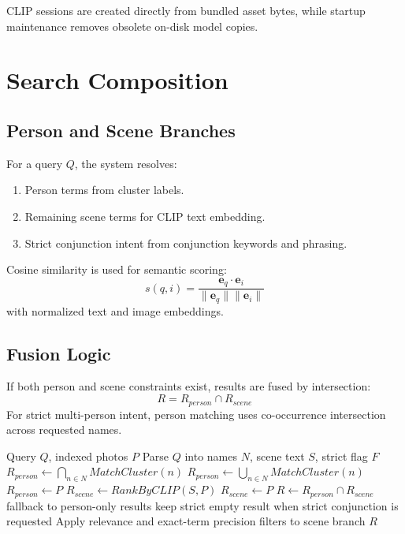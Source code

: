 \documentclass[conference]{IEEEtran}
\begin{document}
CLIP sessions are created directly from bundled asset bytes, while startup maintenance removes obsolete on-disk model copies.

\section{Search Composition}
\subsection{Person and Scene Branches}
For a query $Q$, the system resolves:
\begin{enumerate}
\item Person terms from cluster labels.
\item Remaining scene terms for CLIP text embedding.
\item Strict conjunction intent from conjunction keywords and phrasing.
\end{enumerate}

Cosine similarity is used for semantic scoring:
\begin{equation}
s(q, i) = \frac{\mathbf{e}_q \cdot \mathbf{e}_i}{\|\mathbf{e}_q\|\|\mathbf{e}_i\|}
\end{equation}
with normalized text and image embeddings.

\subsection{Fusion Logic}
If both person and scene constraints exist, results are fused by intersection:
\begin{equation}
R = R_{person} \cap R_{scene}
\end{equation}
For strict multi-person intent, person matching uses co-occurrence intersection across requested names.

\begin{algorithm}[t]
\caption{Mixed Search Fusion in Sense Gallery}
\label{alg:fusion}
\begin{algorithmic}[1]
\Require Query $Q$, indexed photos $P$
\State Parse $Q$ into names $N$, scene text $S$, strict flag $F$
        \State $R_{person} \gets \bigcap_{n \in N} MatchCluster(n)$
    \Else
        \State $R_{person} \gets \bigcup_{n \in N} MatchCluster(n)$
    \EndIf
\Else
    \State $R_{person} \gets P$
\EndIf
{}
    \State $R_{scene} \gets RankByCLIP(S, P)$
\Else
    \State $R_{scene} \gets P$
\EndIf
\State $R \gets R_{person} \cap R_{scene}$
    \State fallback to person-only results
\Else
    \State keep strict empty result when strict conjunction is requested
\EndIf
\State Apply relevance and exact-term precision filters to scene branch
\State \Return $R$
\end{algorithmic}
\end{algorithm}
\end{document}
